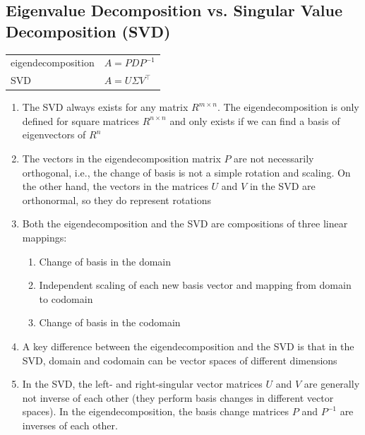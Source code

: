 \subsection{Eigenvalue Decomposition vs. Singular Value Decomposition (SVD)}

\begin{table}[H]
    \begin{tabular}{l l}
        eigendecomposition & $A = PDP^{-1}$ \\
        SVD & $A = U\Sigma V^\top$
    \end{tabular}
\end{table}

\begin{enumerate}
    \item The SVD always exists for any matrix $R^{m\times n}$. The eigendecomposition is only defined for square matrices $R^{n\times n}$ and only exists if we can find a basis of eigenvectors of $R^n$

    \item The vectors in the eigendecomposition matrix $P$ are not necessarily orthogonal, i.e., the change of basis is not a simple rotation and scaling. On the other hand, the vectors in the matrices $U$ and $V$ in the SVD are orthonormal, so they do represent rotations

    \item Both the eigendecomposition and the SVD are compositions of three linear mappings:

    \begin{enumerate}
        \item Change of basis in the domain
    
        \item Independent scaling of each new basis vector and mapping from domain to codomain
    
        \item Change of basis in the codomain
    \end{enumerate}

    \item A key difference between the eigendecomposition and the SVD is that in the SVD, domain and codomain can be vector spaces of different dimensions

    \item In the SVD, the left- and right-singular vector matrices $U$ and $V$ are generally not inverse of each other (they perform basis changes in different vector spaces). In the eigendecomposition, the basis change matrices $P$ and $P^{-1}$ are inverses of each other.


\end{enumerate}
